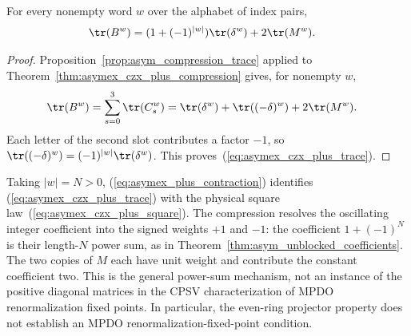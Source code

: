 \begin{theorem}
    \label{thm:asymex_czx_plus_trace}
    \leanok
    For every nonempty word $w$ over the alphabet of index pairs,
    \begin{align}
        \tr(B^w) & =(1+(-1)^{|w|})\tr(\delta^w)+2\tr(M^w).
        \label{eq:asymex_czx_plus_trace}
    \end{align}
\end{theorem}

\begin{proof}
    \leanok
    Proposition~\ref{prop:asym_compression_trace} applied to
    Theorem~\ref{thm:asymex_czx_plus_compression} gives, for nonempty $w$,
    \begin{align}
        \tr(B^w)
         & =\sum_{s=0}^3\tr(C_s^w)
        =\tr(\delta^w)+\tr((-\delta)^w)+2\tr(M^w).
        \notag
    \end{align}
    Each letter of the second slot contributes a factor $-1$, so
    $\tr((-\delta)^w)=(-1)^{|w|}\tr(\delta^w)$.
    This proves~(\ref{eq:asymex_czx_plus_trace}).
\end{proof}

Taking $|w|=N>0$, (\ref{eq:asymex_plus_contraction}) identifies
(\ref{eq:asymex_czx_plus_trace}) with the physical square
law~(\ref{eq:asymex_czx_plus_square}). The compression resolves the
oscillating integer coefficient into the signed weights $+1$ and $-1$:
the coefficient $1+(-1)^N$ is their length-$N$ power sum, as in
Theorem~\ref{thm:asym_unblocked_coefficients}. The two copies of $M$
each have unit weight and contribute the constant coefficient two.
This is the general power-sum mechanism, not an instance of the positive
diagonal matrices in the CPSV characterization of MPDO renormalization
fixed points. In particular, the even-ring projector property does not
establish an MPDO renormalization-fixed-point condition.
